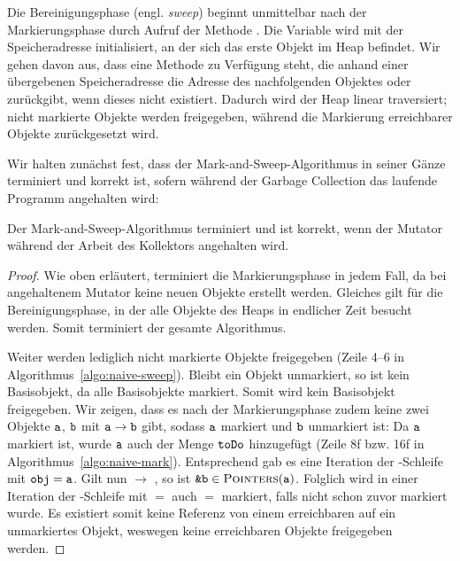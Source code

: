 Die Bereinigungsphase (engl. \textit{sweep}) beginnt unmittelbar nach der Markierungsphase durch Aufruf der Methode .
Die Variable  wird mit der Speicheradresse initialisiert, an der sich das erste Objekt im Heap befindet.
Wir gehen davon aus, dass eine Methode  zu Verfügung steht, die anhand einer übergebenen Speicheradresse die Adresse des nachfolgenden Objektes oder \Null zurückgibt, wenn dieses nicht existiert.
Dadurch wird der Heap linear traversiert; nicht markierte Objekte werden freigegeben, während die Markierung erreichbarer Objekte zurückgesetzt wird.

Wir halten zunächst fest, dass der Mark-and-Sweep-Algorithmus in seiner Gänze terminiert und korrekt ist, sofern während der Garbage Collection das laufende Programm angehalten wird:

\begin{mybox}
\begin{satz}
	\label{satz:mark-sweep-correctness}
	Der Mark-and-Sweep-Algorithmus terminiert und ist korrekt, wenn der Mutator während der Arbeit des Kollektors angehalten wird.
\end{satz}
\end{mybox}

\begin{proof}
	Wie oben erläutert, terminiert die Markierungsphase in jedem Fall, da bei angehaltenem Mutator keine neuen Objekte erstellt werden.
	Gleiches gilt für die Bereinigungsphase, in der alle Objekte des Heaps in endlicher Zeit besucht werden.
	Somit terminiert der gesamte Algorithmus.
	
	Weiter werden lediglich nicht markierte Objekte freigegeben (Zeile 4--6 in Algorithmus~\ref{algo:naive-sweep}).
	Bleibt ein Objekt  unmarkiert, so ist  kein Basisobjekt, da  alle Basisobjekte markiert.
	Somit wird kein Basisobjekt freigegeben.
	Wir zeigen, dass es nach der Markierungsphase zudem keine zwei Objekte $\texttt{a}$, $\texttt{b}$ mit $\texttt{a} \rightarrow \texttt{b}$ gibt, sodass $\texttt{a}$ markiert und $\texttt{b}$ unmarkiert ist:
	Da $\texttt{a}$ markiert ist, wurde $\texttt{a}$ auch der Menge $\texttt{toDo}$ hinzugefügt (Zeile 8f bzw. 16f in Algorithmus~\ref{algo:naive-mark}).
	Entsprechend gab es eine Iteration der \WHILE-Schleife mit $\texttt{obj} = \texttt{a}$.
	Gilt nun  $\rightarrow$ , so ist $\texttt{\&b} \in \textsc{Pointers}(\texttt{a})$.
	Folglich wird in einer Iteration der \FOREACH-Schleife mit  $=$  auch  $=$  markiert, falls  nicht schon zuvor markiert wurde.
	Es existiert somit keine Referenz von einem erreichbaren auf ein unmarkiertes Objekt, weswegen keine erreichbaren Objekte freigegeben werden.
\end{proof}

